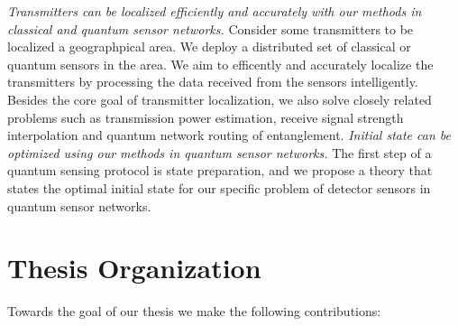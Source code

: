 \emph{Transmitters can be localized efficiently and accurately with our methods in classical and quantum sensor networks.}
Consider some transmitters to be localized a geographpical area. We deploy a distributed set of classical or quantum sensors in the area.
We aim to efficently and accurately localize the transmitters by processing the data received from the sensors intelligently.
Besides the core goal of transmitter localization, we also solve closely related problems such as transmission power estimation, 
receive signal strength interpolation and quantum network routing of entanglement.
\emph{Initial state can be optimized using our methods in quantum sensor networks.} 
The first step of a quantum sensing protocol is state preparation, and we propose a theory that states the optimal initial state 
for our specific problem of detector sensors in quantum sensor networks.

\section{Thesis Organization}

Towards the goal of our thesis we make the following contributions:

